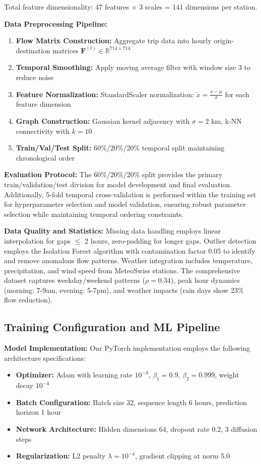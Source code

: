 \documentclass[sigconf,review,nonacm]{acmart}
\begin{document}
Total feature dimensionality: 47 features × 3 scales = 141 dimensions per station.

\textbf{Data Preprocessing Pipeline:}
\begin{enumerate}
\item \textbf{Flow Matrix Construction:} Aggregate trip data into hourly origin-destination matrices $\mathbf{F}^{(t)} \in \mathbb{R}^{714 \times 714}$
\item \textbf{Temporal Smoothing:} Apply moving average filter with window size 3 to reduce noise
\item \textbf{Feature Normalization:} StandardScaler normalization: $\tilde{x} = \frac{x - \mu}{\sigma}$ for each feature dimension
\item \textbf{Graph Construction:} Gaussian kernel adjacency with $\sigma = 2$ km, k-NN connectivity with $k = 10$
\item \textbf{Train/Val/Test Split:} 60\%/20\%/20\% temporal split maintaining chronological order
\end{enumerate}

\textbf{Evaluation Protocol:}
The 60\%/20\%/20\% split provides the primary train/validation/test division for model development and final evaluation. Additionally, 5-fold temporal cross-validation is performed within the training set for hyperparameter selection and model validation, ensuring robust parameter selection while maintaining temporal ordering constraints.

\textbf{Data Quality and Statistics:}
Missing data handling employs linear interpolation for gaps $\leq$ 2 hours, zero-padding for longer gaps. Outlier detection employs the Isolation Forest algorithm with contamination factor 0.05 to identify and remove anomalous flow patterns. Weather integration includes temperature, precipitation, and wind speed from MeteoSwiss stations. The comprehensive dataset captures weekday/weekend patterns ($\rho=0.34$), peak hour dynamics (morning: 7-9am, evening: 5-7pm), and weather impacts (rain days show 23\% flow reduction).

\subsection{Training Configuration and ML Pipeline}

\textbf{Model Implementation:}
Our PyTorch implementation employs the following architecture specifications:
\begin{itemize}
\item \textbf{Optimizer:} Adam with learning rate $10^{-3}$, $\beta_1=0.9$, $\beta_2=0.999$, weight decay $10^{-4}$
\item \textbf{Batch Configuration:} Batch size 32, sequence length 6 hours, prediction horizon 1 hour
\item \textbf{Network Architecture:} Hidden dimensions 64, dropout rate 0.2, 3 diffusion steps
\item \textbf{Regularization:} L2 penalty $\lambda=10^{-4}$, gradient clipping at norm 5.0
\end{itemize}
\end{document}
